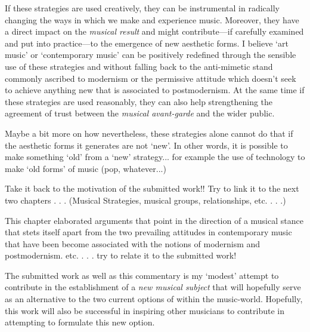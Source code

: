 If these strategies are used creatively, they can be instrumental in radically changing the ways in which we make and experience music. Moreover, they have a direct impact on the \emph{musical result} and might contribute---if carefully examined and put into practice---to the emergence of new aesthetic forms. I believe `art music' or `contemporary music' can be positively redefined through the sensible use of these strategies and without falling back to the anti-mimetic stand commonly ascribed to modernism or the permissive attitude which doesn't seek to achieve anything new that is associated to postmodernism. At the same time if these strategies are used reasonably, they can also help strengthening the agreement of trust between the \emph{musical avant-garde} and the wider public.

Maybe a bit more on how nevertheless, these strategies alone cannot do that if the aesthetic forms it generates are not `new'. In other words, it is possible to make something `old' from a `new' strategy... for example the use of technology to make `old forms' of music (pop, whatever...)

Take it back to the motivation of the submitted work!! Try to link it to the next two chapters . . . (Musical Strategies, musical groups, relationships, etc. . . .)

This chapter elaborated arguments that point in the direction of a musical stance that stets itself apart from the two prevailing attitudes in contemporary music that have been become associated with the notions of modernism and postmodernism. etc. . . . try to relate it to the submitted work!

The submitted work as well as this commentary is my `modest' attempt to contribute in the establishment of a \emph{new musical subject} that will hopefully serve as an alternative to the two current options of within the music-world.  Hopefully, this work will also be successful in inspiring other musicians to contribute in attempting to formulate  this new option.

\label{ch:motivation}